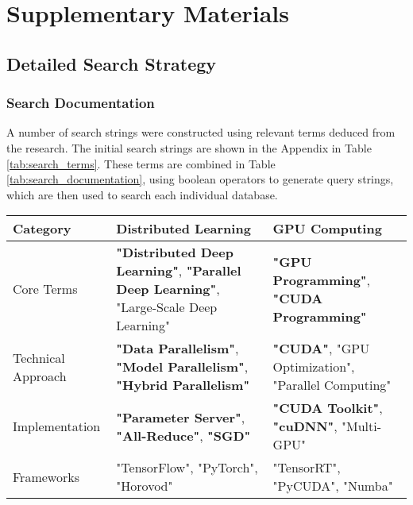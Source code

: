\clearpage
\setcounter{page}{1}
\maketitlesupplementary

\section{Supplementary Materials}
\label{sec:supplementary}

\subsection{Detailed Search Strategy}
\label{sec:search_strategy}

\subsubsection{Search Documentation}


A number of search strings were constructed using relevant terms deduced from the research. The
initial search strings are shown in the Appendix in Table \ref{tab:search_terms}. These terms are
combined in Table \ref{tab:search_documentation}, using boolean operators to generate query
strings, which are then used to search each individual database.

\begin{table*}[htbp!]
    \centering
    \caption{Core Search Terms for Distributed Deep Learning and GPU Programming}
    \label{tab:search_terms}
    \begin{tabularx}{\textwidth}{|l|X|X|}
        \hline
        \textbf{Category} & \textbf{Distributed Learning} & \textbf{GPU Computing} \\
        \hline
        Core Terms & 
        \textbf{"Distributed Deep Learning"},
        \textbf{"Parallel Deep Learning"},
        "Large-Scale Deep Learning" &
        \textbf{"GPU Programming"},
        \textbf{"CUDA Programming"} \\
        \hline
        Technical Approach & 
        \textbf{"Data Parallelism"},
        \textbf{"Model Parallelism"},
        \textbf{"Hybrid Parallelism"} &
        \textbf{"CUDA"},
        "GPU Optimization",
        "Parallel Computing" \\
        \hline
        Implementation & 
        \textbf{"Parameter Server"},
        \textbf{"All-Reduce"},
        \textbf{"SGD"} &
        \textbf{"CUDA Toolkit"},
        \textbf{"cuDNN"},
        "Multi-GPU" \\
        \hline
        Frameworks & 
        "TensorFlow",
        "PyTorch", 
        "Horovod" &
        "TensorRT",
        "PyCUDA",
        "Numba" \\
        \hline
    \end{tabularx}
    \caption*{Note: Bold terms indicate primary search terms that will be prioritized.}
\end{table*}

